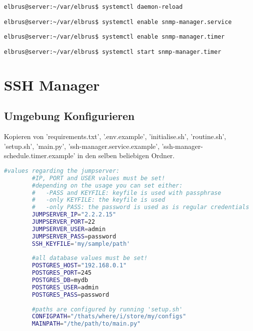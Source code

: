 \documentclass{article}
\begin{document}
	\begin{lstlisting}[caption={Neuladen des 'systemctl' Deamons}]
		elbrus@server:~/var/elbrus$ systemctl daemon-reload
	\end{lstlisting}
	
	\begin{lstlisting}[caption={Aktivieren des Serviceprogrammes}]
		elbrus@server:~/var/elbrus$ systemctl enable snmp-manager.service
	\end{lstlisting}
	
	\begin{lstlisting}[caption={Aktivieren des Zeitplanungsprogrammes}]
		elbrus@server:~/var/elbrus$ systemctl enable snmp-manager.timer
	\end{lstlisting}
	
	\begin{lstlisting}[caption={Starten des Zeitplanungsprogrammes}]
		elbrus@server:~/var/elbrus$ systemctl start snmp-manager.timer
	\end{lstlisting}
	\newpage
	
	\section{SSH Manager}
	\subsection[file config]{Umgebung Konfigurieren}
	
	Kopieren von 'requirements.txt', '.env.example', 'initialise.sh', 'routine.sh', 'setup.sh', 'main.py', 'ssh-manager.service.example', 'ssh-manager-schedule.timer.example' in den selben beliebigen Ordner. 
	
	\lstset{style=files}
	\begin{lstlisting}[caption={Anhand von '.env.example' eigene '.env' Datei anlegen}, language=bash]
		#values regarding the jumpserver:
		#IP, PORT and USER values must be set!
		#depending on the usage you can set either:
		#   -PASS and KEYFILE: keyfile is used with passphrase
		#   -only KEYFILE: the keyfile is used
		#   -only PASS: the password is used as is regular credentials
		JUMPSERVER_IP="2.2.2.15"
		JUMPSERVER_PORT=22
		JUMPSERVER_USER=admin
		JUMPSERVER_PASS=password
		SSH_KEYFILE='my/sample/path'
		
		#all database values must be set!
		POSTGRES_HOST="192.168.0.1"
		POSTGRES_PORT=245
		POSTGRES_DB=mydb
		POSTGRES_USER=admin
		POSTGRES_PASS=password
		
		#paths are configured by running 'setup.sh'
		CONFIGPATH="/thats/where/i/store/my/configs"
		MAINPATH="/the/path/to/main.py"
	\end{lstlisting}
	
\end{document}
